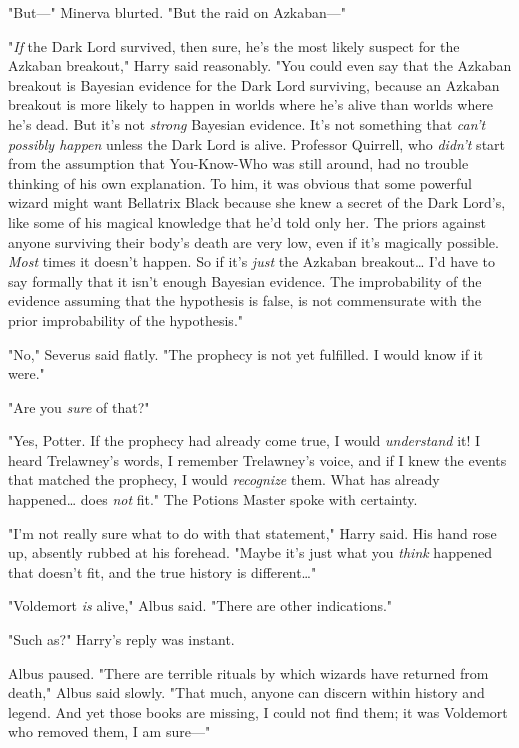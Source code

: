 "But---" Minerva blurted. "But the raid on Azkaban---"

"\emph{If} the Dark Lord survived, then sure, he's the most likely suspect for
the Azkaban breakout," Harry said reasonably. "You could even say that the
Azkaban breakout is Bayesian evidence for the Dark Lord surviving, because an
Azkaban breakout is more likely to happen in worlds where he's alive than
worlds where he's dead. But it's not \emph{strong} Bayesian evidence. It's not
something that \emph{can't possibly happen} unless the Dark Lord is alive.
Professor Quirrell, who \emph{didn't} start from the assumption that
You-Know-Who was still around, had no trouble thinking of his own explanation.
To him, it was obvious that some powerful wizard might want Bellatrix Black
because she knew a secret of the Dark Lord's, like some of his magical
knowledge that he'd told only her. The priors against anyone surviving their
body's death are very low, even if it's magically possible. \emph{Most} times
it doesn't happen. So if it's \emph{just} the Azkaban breakout{\ldots} I'd have
to say formally that it isn't enough Bayesian evidence. The improbability of
the evidence assuming that the hypothesis is false, is not commensurate with
the prior improbability of the hypothesis."

"No," Severus said flatly. "The prophecy is not yet fulfilled. I would know if
it were."

"Are you \emph{sure} of that?"

"Yes, Potter. If the prophecy had already come true, I would \emph{understand}
it! I heard Trelawney's words, I remember Trelawney's voice, and if I knew the
events that matched the prophecy, I would \emph{recognize} them. What has
already happened{\ldots} does \emph{not} fit." The Potions Master spoke with
certainty.

"I'm not really sure what to do with that statement," Harry said. His hand rose
up, absently rubbed at his forehead. "Maybe it's just what you \emph{think}
happened that doesn't fit, and the true history is different{\ldots}"

"Voldemort \emph{is} alive," Albus said. "There are other indications."

"Such as?" Harry's reply was instant.

Albus paused. "There are terrible rituals by which wizards have returned from
death," Albus said slowly. "That much, anyone can discern within history and
legend. And yet those books are missing, I could not find them; it was
Voldemort who removed them, I am sure---"

